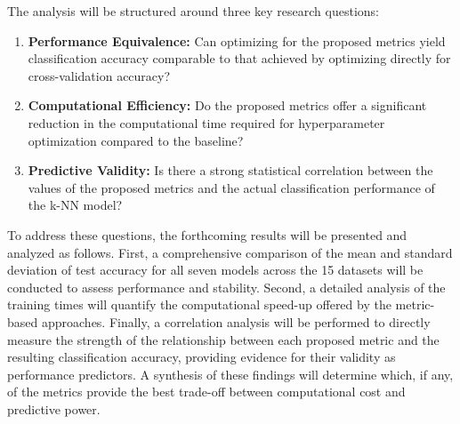 \documentclass[conference]{IEEEtran}
\begin{document}
The analysis will be structured around three key research questions:
\begin{enumerate}
    \item \textbf{Performance Equivalence:} Can optimizing for the proposed metrics yield classification accuracy comparable to that achieved by optimizing directly for cross-validation accuracy?
    \item \textbf{Computational Efficiency:} Do the proposed metrics offer a significant reduction in the computational time required for hyperparameter optimization compared to the baseline?
    \item \textbf{Predictive Validity:} Is there a strong statistical correlation between the values of the proposed metrics and the actual classification performance of the k-NN model?
\end{enumerate}
To address these questions, the forthcoming results will be presented and analyzed as follows. First, a comprehensive comparison of the mean and standard deviation of test accuracy for all seven models across the 15 datasets will be conducted to assess performance and stability. Second, a detailed analysis of the training times will quantify the computational speed-up offered by the metric-based approaches. Finally, a correlation analysis will be performed to directly measure the strength of the relationship between each proposed metric and the resulting classification accuracy, providing evidence for their validity as performance predictors. A synthesis of these findings will determine which, if any, of the metrics provide the best trade-off between computational cost and predictive power.
\end{document}
